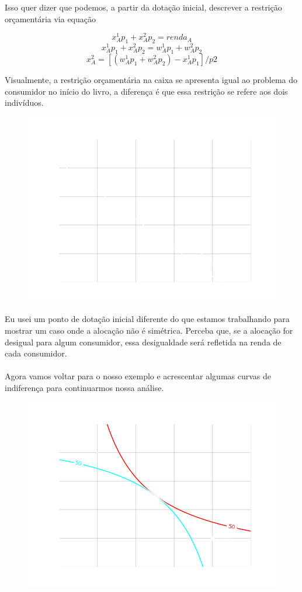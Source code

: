 \documentclass[a4paper,11pt,oneside]{book}
\theoremstyle{definition}
\theoremstyle{break}
\begin{document}
Isso quer dizer que podemos, a partir da dotação inicial, descrever a restrição orçamentária via equação

$$ x_A^1 p_1 + x_A^2 p_2 = renda_A$$
$$ x_A^1 p_1 + x_A^2 p_2 = w_A^1 p_1 + w_A^2 p_2$$
$$ x_A^2 = [(w_A^1 p_1 + w_A^2 p_2) - x_A^1 p_1]/p2$$

Visualmente, a restrição orçamentária na caixa se apresenta igual ao problema do consumidor no início do livro, a diferença é que essa restrição se refere aos dois indivíduos.

\begin{figure}[H]
\centering
\includegraphics[scale=0.6]{cap32_4-caixa_edgeworth_1.png}
\end{figure}

Eu usei um ponto de dotação inicial diferente do que estamos trabalhando para mostrar um caso onde a alocação não é simétrica. Perceba que, se a alocação for desigual para algum consumidor, essa desigualdade será refletida na renda de cada consumidor. 
\\~\\
Agora vamos voltar para o nosso exemplo e acrescentar algumas curvas de indiferença para continuarmos nossa análise.

\begin{figure}[H]
\centering
\includegraphics[scale=0.6]{cap32_4-caixa_edgeworth_2.png}
\end{figure}
\end{document}
